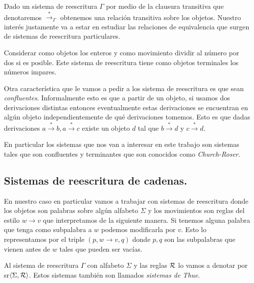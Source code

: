 \documentclass[tesis.tex]{subfiles}
\begin{document}
Dado un sistema de reescritura $\Gamma$ por medio de la clausura transitiva que denotaremos $\overset{*}{\rightarrow}_{\Gamma}$ obtenemos una relación transitiva sobre los objetos. Nuestro interés justamente va a estar en estudiar las relaciones de equivalencia que surgen de sistemas de reescritura particulares. 

\begin{ej}
	Considerar como objetos los enteros y como movimiento dividir al número por dos si es posible. Este sistema de reescritura tiene como objetos terminales los números impares.
\end{ej}

Otra característica que le vamos a pedir a los sistema de reescritura es que sean \emph{confluentes}. Informalmente esto es que a partir de un objeto, si usamos dos derivaciones distintas entonces eventualmente estas derivaciones se encuentran en algún objeto independientemente de qué derivaciones tomemos. Esto es que dadas derivaciones $a \overset{*}{\rightarrow} b, a \overset{*}{\rightarrow} c$ existe un objeto $d$ tal que $b \overset{*}{\rightarrow} d$ y $c \overset{*}{\rightarrow} d$.

En particular los sistemas que nos van a interesar en este trabajo son sistemas tales que son confluentes y terminantes que son conocidos como \emph{Church-Roser}.

\subsection{Sistemas de reescritura de cadenas.}
En nuestro caso en particular vamos a trabajar con sistemas de reescritura donde los objetos son palabras sobre algún alfabeto $\Sigma$ y los movimientos son reglas del estilo $w \to v$ que interpretamos de la siguiente manera. Si tenemos alguna palabra que tenga como subpalabra a $w$ podemos modificarla por $v$. Esto lo representamos por el triple $(p, w \to v, q)$ donde $p,q$ son las subpalabras que vienen antes de $w$ tales que pueden ser vacías. 

Al sistema de reescritura $\Gamma$ con alfabeto $\Sigma$ y las reglas $\cal R$ lo vamos a denotar por sr$\left< \Sigma, {\cal R} \right>$. Estos sistemas también son llamados \emph{sistemas de Thue}.
\end{document}
